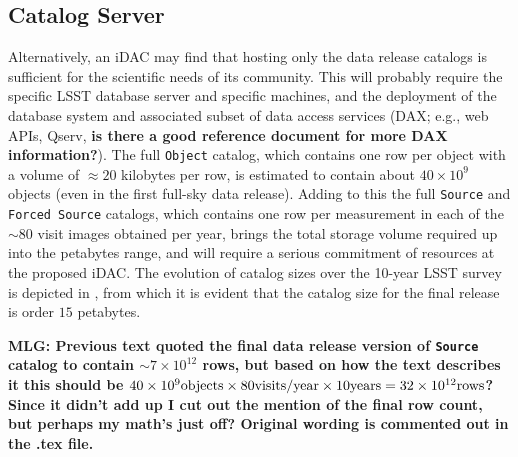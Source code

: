 \subsection{Catalog Server}

Alternatively, an iDAC may find that hosting only the data release catalogs is sufficient for the scientific needs of its community. This will probably require the specific LSST database server  and specific machines, and the deployment of the database system and associated subset of data access services (DAX; e.g., web APIs, Qserv, {\bf is there a good reference document for more DAX information?}). The full {\tt Object} catalog, which contains one row per object with a volume of $\approx 20$ kilobytes per row, is estimated to contain about $40 \times 10^9$ objects (even in the first full-sky data release). Adding to this the full {\tt Source} and {\tt Forced Source} catalogs, which contains one row per measurement in each of the $\sim80$ visit images obtained per year, brings the total storage volume required up into the petabytes range, and will require a serious commitment of resources at the proposed iDAC. The evolution of catalog sizes over the 10-year LSST survey is depicted in , from which it is evident that the catalog size for the final release is order $15$ petabytes.

{\bf MLG: Previous text quoted the final data release version of {\tt Source} catalog to contain $\sim7 \times 10^{12}$ rows, but based on how the text describes it this should be $40 \times 10^9 {\rm objects} \times 80 {\rm visits / year} \times 10 {\rm years} = 32 \times 10^{12} {\rm rows}$? Since it didn't add up I cut out the mention of the final row count, but perhaps my math's just off? Original wording is commented out in the .tex file.}


